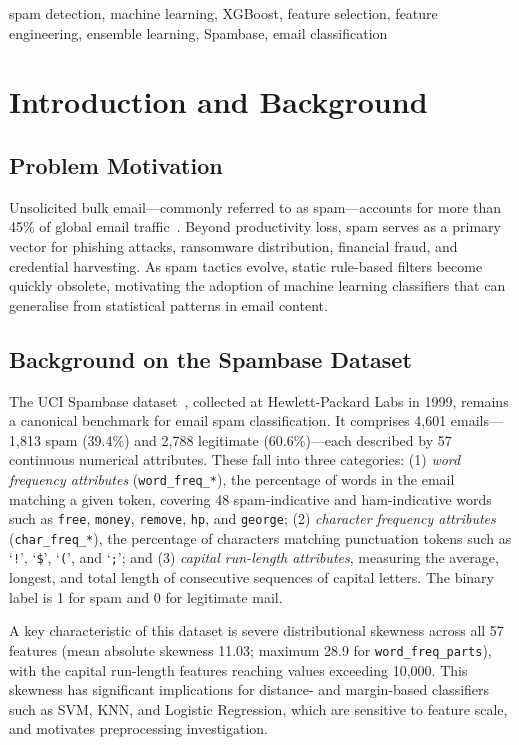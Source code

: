 \documentclass[conference]{IEEEtran}
\begin{document}
\begin{IEEEkeywords}
spam detection, machine learning, XGBoost, feature selection, feature engineering, ensemble learning, Spambase, email classification
\end{IEEEkeywords}

\section{Introduction and Background}

\subsection{Problem Motivation}
Unsolicited bulk email---commonly referred to as spam---accounts for more than 45\% of global email traffic~\cite{ref1}. Beyond productivity loss, spam serves as a primary vector for phishing attacks, ransomware distribution, financial fraud, and credential harvesting. As spam tactics evolve, static rule-based filters become quickly obsolete, motivating the adoption of machine learning classifiers that can generalise from statistical patterns in email content.

\subsection{Background on the Spambase Dataset}
The UCI Spambase dataset~\cite{ref2}, collected at Hewlett-Packard Labs in 1999, remains a canonical benchmark for email spam classification. It comprises 4,601 emails---1,813 spam (39.4\%) and 2,788 legitimate (60.6\%)---each described by 57 continuous numerical attributes. These fall into three categories: (1) \textit{word frequency attributes} (\texttt{word\_freq\_*}), the percentage of words in the email matching a given token, covering 48 spam-indicative and ham-indicative words such as \texttt{free}, \texttt{money}, \texttt{remove}, \texttt{hp}, and \texttt{george}; (2) \textit{character frequency attributes} (\texttt{char\_freq\_*}), the percentage of characters matching punctuation tokens such as `\texttt{!}', `\texttt{\$}', `\texttt{(}', and `\texttt{;}'; and (3) \textit{capital run-length attributes}, measuring the average, longest, and total length of consecutive sequences of capital letters. The binary label is 1 for spam and 0 for legitimate mail.

A key characteristic of this dataset is severe distributional skewness across all 57 features (mean absolute skewness 11.03; maximum 28.9 for \texttt{word\_freq\_parts}), with the capital run-length features reaching values exceeding 10,000. This skewness has significant implications for distance- and margin-based classifiers such as SVM, KNN, and Logistic Regression, which are sensitive to feature scale, and motivates preprocessing investigation.
\end{document}
